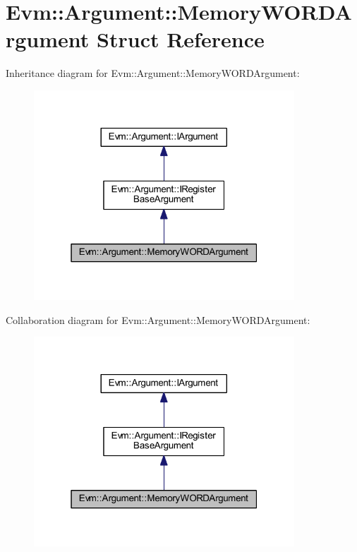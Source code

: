 \hypertarget{struct_evm_1_1_argument_1_1_memory_w_o_r_d_argument}{}\section{Evm\+:\+:Argument\+:\+:Memory\+W\+O\+R\+D\+Argument Struct Reference}
\label{struct_evm_1_1_argument_1_1_memory_w_o_r_d_argument}


Inheritance diagram for Evm\+:\+:Argument\+:\+:Memory\+W\+O\+R\+D\+Argument\+:
\nopagebreak
\begin{figure}[H]
\begin{center}
\leavevmode
\includegraphics[width=277pt]{struct_evm_1_1_argument_1_1_memory_w_o_r_d_argument__inherit__graph}
\end{center}
\end{figure}


Collaboration diagram for Evm\+:\+:Argument\+:\+:Memory\+W\+O\+R\+D\+Argument\+:
\nopagebreak
\begin{figure}[H]
\begin{center}
\leavevmode
\includegraphics[width=277pt]{struct_evm_1_1_argument_1_1_memory_w_o_r_d_argument__coll__graph}
\end{center}
\end{figure}
